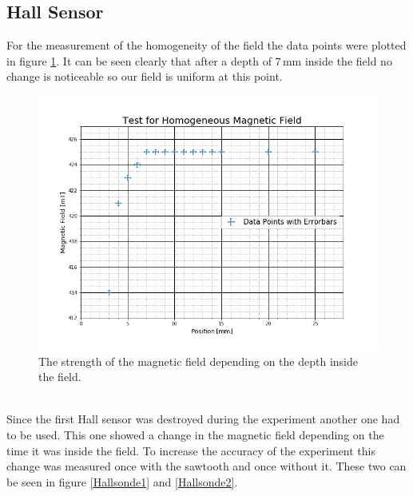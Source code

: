 \subsection{Hall Sensor}
For the measurement of the homogeneity of the field the data points were plotted in figure \ref{Homogen}. It can be seen clearly that after a depth of $7$\,mm inside the field no change is noticeable so our field is uniform at this point.
\begin{figure}[ht]
	\includegraphics[scale=0.5]{Bild/Hallsonde}
	\centering
	\caption[Uniformity of the Magnetic Field]{The strength of the magnetic field depending on the depth inside the field.}
	\label{Homogen}
\end{figure}\\
Since the first Hall sensor was destroyed during the experiment another one had to be used. This one showed a change in the magnetic field depending on the time it was inside the field. To increase the accuracy of the experiment this change was measured once with the sawtooth and once without it. These two can be seen in figure \ref{Hallsonde1} and \ref{Hallsonde2}.
